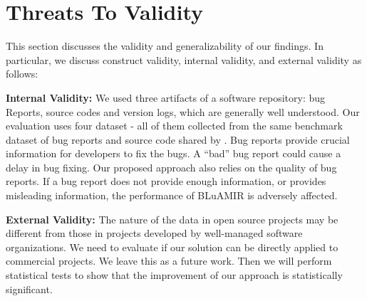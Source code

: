 \documentclass[conference]{IEEEtran}
\begin{document}



\section{Threats To Validity}\label{sec:threats}
This section discusses the validity and generalizability of our findings. In particular, we discuss construct validity, internal validity, and external validity as follows:

\textbf{Internal Validity:} We used three artifacts of a software repository: bug Reports, source codes and version logs, which are generally well understood. Our evaluation uses four dataset - all of them collected from the same benchmark dataset of bug reports and source code shared by \citet{Jian}. Bug reports provide crucial information for developers to fix the bugs. A “bad” bug report could cause a delay in bug fixing. Our proposed approach also relies on the quality of bug reports. If a bug report does not provide enough information, or provides misleading information, the performance of BLuAMIR is adversely affected.

\textbf{External Validity:} 
The nature of the data in open source projects may be different from those in projects developed by well-managed software organizations. We need to evaluate if our solution can be directly applied to commercial projects. We leave this as a future work. Then we will perform statistical tests to show that the improvement of our approach is statistically significant.
\end{document}
